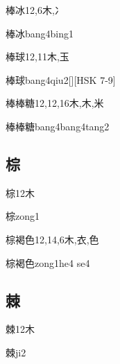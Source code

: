 \begin{Entry}{棒冰}{12,6}{⽊,⼎}
  \begin{Phonetics}{棒冰}{bang4bing1}
  \end{Phonetics}
\end{Entry}

\begin{Entry}{棒球}{12,11}{⽊,⽟}
  \begin{Phonetics}{棒球}{bang4qiu2}[][HSK 7-9]
  \end{Phonetics}
\end{Entry}

\begin{Entry}{棒棒糖}{12,12,16}{⽊,⽊,⽶}
  \begin{Phonetics}{棒棒糖}{bang4bang4tang2}
  \end{Phonetics}
\end{Entry}

\subsection*{棕}

\begin{Entry}{棕}{12}{⽊}
  \begin{Phonetics}{棕}{zong1}
  \end{Phonetics}
\end{Entry}

\begin{Entry}{棕褐色}{12,14,6}{⽊,⾐,⾊}
  \begin{Phonetics}{棕褐色}{zong1he4 se4}
  \end{Phonetics}
\end{Entry}

\subsection*{棘}

\begin{Entry}{棘}{12}{⽊}
  \begin{Phonetics}{棘}{ji2}
  \end{Phonetics}
\end{Entry}

